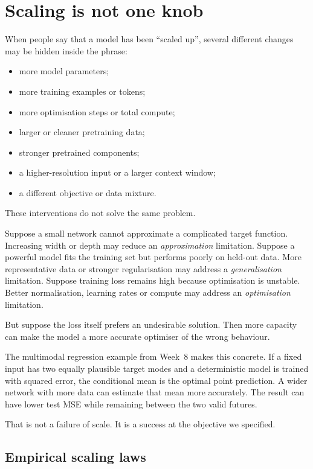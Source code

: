 \section{Scaling is not one knob}

When people say that a model has been ``scaled up'', several different changes may be hidden inside the phrase:
\begin{itemize}[leftmargin=*]
  \item more model parameters;
  \item more training examples or tokens;
  \item more optimisation steps or total compute;
  \item larger or cleaner pretraining data;
  \item stronger pretrained components;
  \item a higher-resolution input or a larger context window;
  \item a different objective or data mixture.
\end{itemize}

These interventions do not solve the same problem.

Suppose a small network cannot approximate a complicated target function. Increasing width or depth may reduce an \emph{approximation} limitation. Suppose a powerful model fits the training set but performs poorly on held-out data. More representative data or stronger regularisation may address a \emph{generalisation} limitation. Suppose training loss remains high because optimisation is unstable. Better normalisation, learning rates or compute may address an \emph{optimisation} limitation.

But suppose the loss itself prefers an undesirable solution. Then more capacity can make the model a more accurate optimiser of the wrong behaviour.

The multimodal regression example from Week~8 makes this concrete. If a fixed input has two equally plausible target modes and a deterministic model is trained with squared error, the conditional mean is the optimal point prediction. A wider network with more data can estimate that mean more accurately. The result can have lower test MSE while remaining between the two valid futures.

That is not a failure of scale. It is a success at the objective we specified.

\subsection{Empirical scaling laws}

